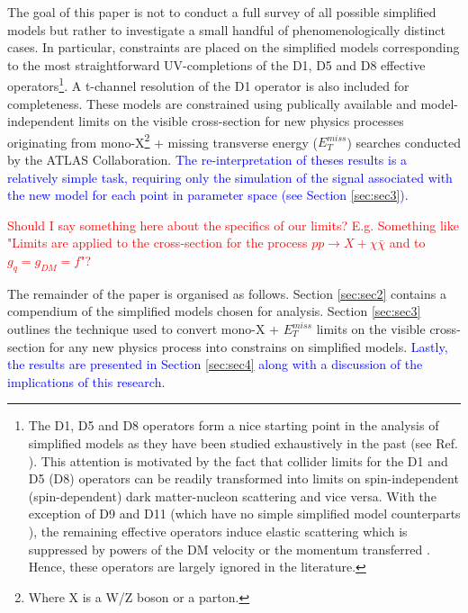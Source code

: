 \begin{flushleft}
\hspace{1cm}The goal of this paper is not to conduct a full survey of all possible simplified models but rather to investigate a small handful of phenomenologically distinct cases. In particular, constraints are placed on the simplified models corresponding to the most straightforward UV-completions of the D1, D5 and D8 effective operators\footnote{The D1, D5 and D8 operators form a nice starting point in the analysis of simplified models as they have been studied exhaustively in the past (see Ref. \cite{}). This attention is motivated by the fact that collider limits for the D1 and D5 (D8) operators can be readily transformed into limits on spin-independent (spin-dependent) dark matter-nucleon scattering and vice versa. With the exception of D9 and D11 (which have no simple simplified model counterparts \cite{}), the remaining effective operators induce elastic scattering which is suppressed by powers of the DM velocity or the momentum transferred \cite{Kumar}. Hence, these operators are largely ignored in the literature.}. A t-channel resolution of the D1 operator is also included for completeness. These models are constrained using publically available and model-independent limits on the visible cross-section for new physics processes originating from mono-X\footnote{Where X is a W/Z boson or a parton.} + missing transverse energy ($E_{T}^{miss}$) searches conducted by the ATLAS Collaboration.  \textcolor{blue}{The re-interpretation of theses results is a relatively simple task, requiring only the simulation of the signal associated with the new model for each point in parameter space (see Section \ref{sec:sec3}).}

\hspace{1cm}\textcolor{red}{Should I say something here about the specifics of our limits? E.g. Something like "Limits are applied to the cross-section for the process $pp \rightarrow X + \chi\bar{\chi}$ and to $g_{q} = g_{DM} = f$"?}

\hspace{1cm}The remainder of the paper is organised as follows. Section \ref{sec:sec2} contains a compendium of the simplified models chosen for analysis. Section \ref{sec:sec3} outlines the technique used to convert mono-X + $E_{T}^{miss}$ limits on the visible cross-section for any new physics process into constrains on simplified models. \textcolor{blue}{Lastly, the results are presented in Section \ref{sec:sec4} along with a discussion of the implications of this research.}
\bigskip


\end{flushleft}

